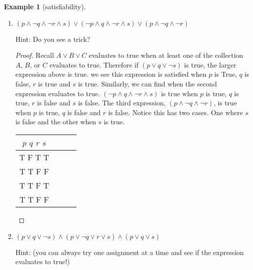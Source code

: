 \documentclass[letterpaper,10pt]{article}
\theoremstyle{plain}
\theoremstyle{definition}
\newtheorem{exmp}[thm]{Example}
\theoremstyle{remark}
\providecommand{\land}{\ensuremath{\wedge}}
\providecommand{\lor}{\ensuremath{\vee}}
\begin{document}
\newpage
\begin{exmp}[satisfiability]

\begin{enumerate}
  Determine whether the following compound propositions are satisfiable. If it is satisfiable, provide an assignment, otherwise show why it is not satisfiable. (Recall that a compound expression is satisfiable if there exists a model or world in which the expression is True.)
  
  \item $(p \land \lnot q \land \lnot r \land s) \lor (\lnot p \land q \land \lnot r \land s) \lor (p \land \lnot q \land \lnot r)$
  
 Hint: Do you see a trick?
  \begin{proof}
  
 Recall $A\lor B \lor C$ evaluates to true when at least one of the collection $A$, $B$, or $C$ evaluates to true. Therefore if $(p \lor q \lor \lnot s) $ is true, the larger expression above is true. 
 we see this expression is satisfied when $p$ is True, $q$ is false, $r$ is true and $s$ is true.
 Similarly, we can find when the second expression evaluates to true. $(\lnot p \land q \land \lnot r \land s)$ is true when $p$ is true, $q$ is true, $r$ is false and $s$ is false.
 The third expression, $(p \land \lnot q \land \lnot r)$, is true when $p$ is true, $q$ is false and $r$ is false. Notice this has two cases. One where $s$ is false and the other when $s$ is true. 
  \begin{center}
        \begin{tabular}{ | c | c | c |c |} 
  \hline
 $p$ $q$ $r$ $s$ \\
 \hline
  T F T T\\ 
  T T F F \\ 
  T T F T \\ 
  T T F F \\ 
  \hline
\end{tabular}
        \end{center}
 
 \end{proof}
 
 
  \item $(p \lor q \lor \lnot s) \land (p \lor \lnot q \lor r \lor s) \land (p \lor q \lor s)$

 Hint: (you can always try one assignment at a time and see if the expression evaluates to true!)

 
 \vspace{3cm}
\end{enumerate}
\end{exmp}
\end{document}

